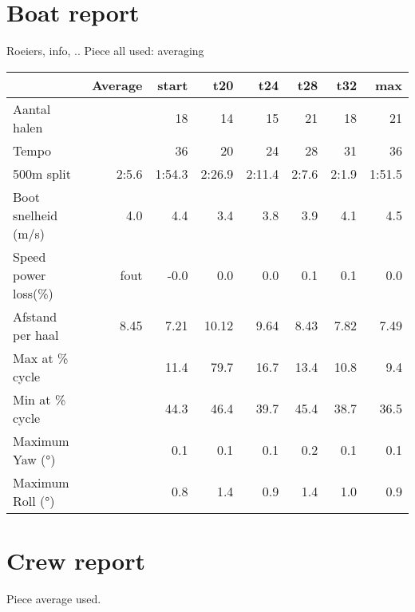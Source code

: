 \documentclass[12pt]{article}%
\begin{document}
%
\normalsize%
\section*{Boat report}%
\label{sec:Boatreport}%
Roeiers, info, ..\newline%
%
Piece all used: averaging \newline%
%
\begin{tabular}{l|rrrrrrr|}%
\hline%
&Average&start&t20&t24&t28&t32&max\\%
\hline%
Aantal halen&&18&14&15&21&18&21\\%
Tempo&&36&20&24&28&31&36\\%
500m split&2:5.6&1:54.3&2:26.9&2:11.4&2:7.6&2:1.9&1:51.5\\%
Boot snelheid (m/s)&4.0&4.4&3.4&3.8&3.9&4.1&4.5\\%
Speed power loss(\%)&fout&{-}0.0&0.0&0.0&0.1&0.1&0.0\\%
Afstand per haal&8.45&7.21&10.12&9.64&8.43&7.82&7.49\\%
Max at \% cycle&&11.4&79.7&16.7&13.4&10.8&9.4\\%
Min at \% cycle&&44.3&46.4&39.7&45.4&38.7&36.5\\%
Maximum Yaw (°)&&0.1&0.1&0.1&0.2&0.1&0.1\\%
Maximum Roll (°)&&0.8&1.4&0.9&1.4&1.0&0.9\\%
\hline%
\end{tabular}%
\newline%
%

%
\newpage%
\section*{Crew report}%
\label{sec:Crewreport}%
Piece average used.\newline%
%

%
\newpage%
\end{document}
